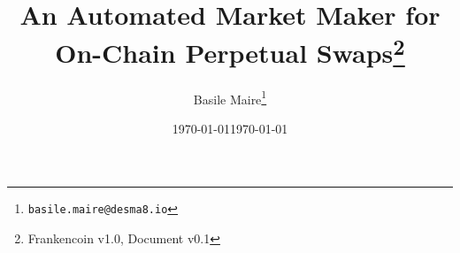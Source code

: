 \documentclass[english,11pt]{article}
\newcommand{\nothing}[1]{}
\begin{document}
\title{An Automated Market Maker for On-Chain Perpetual Swaps\thanks{Frankencoin v1.0,
Document v0.1}}
\bigskip
\bigskip



{
\date{ \today  }


\author{
Basile Maire\thanks{\texttt{basile.maire@desma8.io}}\\}
}

\bigskip
\bigskip

\bigskip
\date{\today }




\newpage
\newpage
\thispagestyle{empty}


\nothing{
	\newpage
	\thispagestyle{empty}
	
	\vspace{2.5cm}
	
	\thispagestyle{empty}
	
	\vspace{2.5cm}
	\smallskip
	\centerline{\bf {\Large Frankencoin - Risk Considerations}}
	
	\vspace{.5cm}
	\begin{abstract}
	\nopagebreak 
	\end{abstract}
	\bigskip
	\bigskip
	
	
	\bigskip
	
	
	\bigskip

	\newpage

	\newpage
}
\setcounter{page}{1}

\end{document}
